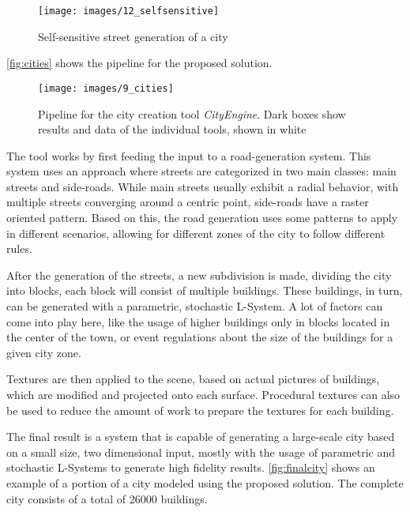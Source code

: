 \documentclass{acmtog}
\begin{document}
\begin{figure}[!htp]
  \begin{center}
    \texttt{[image: images/12\_selfsensitive]}
    \caption{Self-sensitive street generation of a city \label{fig:pruning}}
    \end{center}
\end{figure}

\autoref{fig:cities} shows the pipeline for the proposed solution.

\begin{figure}[!htp]
  \begin{center}
    \texttt{[image: images/9\_cities]}
    \caption{Pipeline for the city creation tool \emph{CityEngine}. Dark boxes show results and data of the individual tools, shown in white \label{fig:cities}}
    \end{center}
\end{figure}

The tool works by first feeding the input to a road-generation system. This system uses an approach where streets are categorized in two main classes: main streets and side-roads. While main streets usually exhibit a radial behavior, with multiple streets converging around a centric point, side-roads have a raster oriented pattern. Based on this, the road generation uses some patterns to apply in different scenarios, allowing for different zones of the city to follow different rules.

After the generation of the streets, a new subdivision is made, dividing the city into blocks, each block will consist of multiple buildings. These buildings, in turn, can be generated with a parametric, stochastic L-System. A lot of factors can come into play here, like the usage of higher buildings only in blocks located in the center of the town, or event regulations about the size of the buildings for a given city zone.

Textures are then applied to the scene, based on actual pictures of buildings, which are modified and projected onto each surface. Procedural textures can also be used to reduce the amount of work to prepare the textures for each building.

The final result is a system that is capable of generating a large-scale city based on a small size, two dimensional input, mostly with the usage of parametric and stochastic L-Systems to generate high fidelity results. \autoref{fig:finalcity} shows an example of a portion of a city modeled using the proposed solution. The complete city consists of a total of 26000 buildings.
\end{document}
